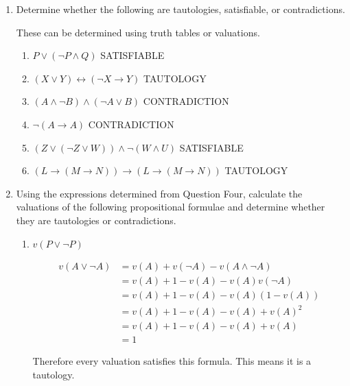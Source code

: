 \documentclass[11pt]{report}
\begin{document}
\begin{enumerate}
	\newpage
	\item Determine whether the following are tautologies, satisfiable, or contradictions.
	
	\hspace{0.2cm}{\bf Solution}

	These can be determined using truth tables or valuations. 
	
		\begin{enumerate}
			\item $P \lor (\lnot P \land Q)$ SATISFIABLE
			\item $(X \lor Y) \leftrightarrow (\lnot X \rightarrow Y)$ TAUTOLOGY
			\item $(A \land \lnot B) \land (\lnot A \lor B)$ CONTRADICTION
			\item $\lnot (A\rightarrow A)$ CONTRADICTION
			\item $(Z \lor (\lnot Z \lor W)) \land \lnot (W \land U)$ SATISFIABLE
			\item $(L \rightarrow (M \rightarrow N)) \rightarrow (L \rightarrow (M \rightarrow N))$ TAUTOLOGY
		\end{enumerate}

	\item Using the expressions determined from Question Four, calculate the valuations of the following propositional formulae and determine whether they are tautologies or contradictions. 

		\begin{enumerate}
			\item $v(P \lor \lnot P)$
			
			\hspace{0.2cm}{\bf Solution}

			\begin{equation*}
				\begin{split}
					v(A \lor \lnot A) &= v(A) + v(\lnot A) - v(A \land \lnot A) \\ 
					&= v(A) + 1 - v(A) - v(A)v(\lnot A)\\
					&= v(A) + 1 - v(A) - v(A)(1 - v(A))\\
					&= v(A) + 1 - v(A) - v(A) + v(A)^{2}\\
					&= v(A) + 1 - v(A) - v(A) + v(A)\\
					&= 1	
				\end{split}
			\end{equation*}

			Therefore every valuation satisfies this formula. This means it is a tautology. 


\end{enumerate}
\end{enumerate}
\end{document}
